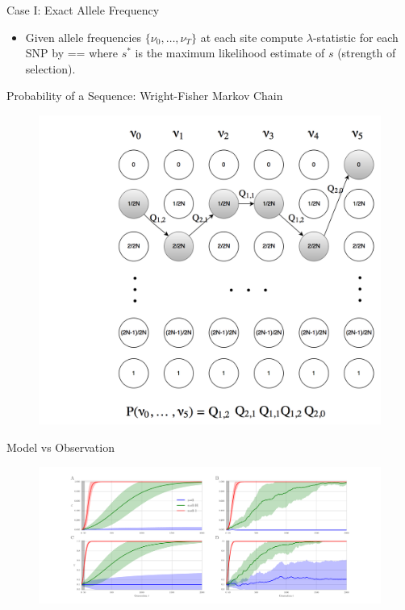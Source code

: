 \documentclass[t]{beamer} %
\begin{document}
	\begin{frame}{Case I: Exact Allele Frequency}
		\begin{itemize}
			\item Given allele frequencies $\{\nu_0,\ldots, \nu_T\}$ at each site compute $\lambda$-statistic for each SNP by
		\beq
		\lambda==
		\eeq
		where $s^*$ is the maximum likelihood estimate of $s$ (strength of selection).
		\end{itemize}
	\end{frame}	
	
	\begin{frame}{Probability of a Sequence: Wright-Fisher Markov Chain}
		\begin{figure}
		\includegraphics[trim={0.05in 0.0in 0.in 0in},clip,scale=0.18]{../figures/markoveg}
	\end{figure}
	\end{frame}
	\begin{frame}{Model vs Observation}
		\begin{figure}
			\includegraphics[trim={0.05in 0.0in 0.in 0in},clip,scale=0.25]{../figures/AF}
		\end{figure}
	\end{frame}
	
\end{document}
